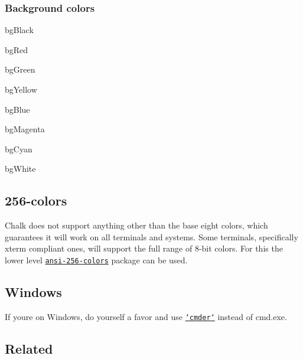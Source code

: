 \subsubsection*{Background colors}


\begin{DoxyItemize}
\item {\ttfamily bg\+Black}
\item {\ttfamily bg\+Red}
\item {\ttfamily bg\+Green}
\item {\ttfamily bg\+Yellow}
\item {\ttfamily bg\+Blue}
\item {\ttfamily bg\+Magenta}
\item {\ttfamily bg\+Cyan}
\item {\ttfamily bg\+White}
\end{DoxyItemize}

\subsection*{256-\/colors}

Chalk does not support anything other than the base eight colors, which guarantees it will work on all terminals and systems. Some terminals, specifically {\ttfamily xterm} compliant ones, will support the full range of 8-\/bit colors. For this the lower level \href{https://github.com/jbnicolai/ansi-256-colors}{\tt ansi-\/256-\/colors} package can be used.

\subsection*{Windows}

If you\textquotesingle{}re on Windows, do yourself a favor and use \href{http://bliker.github.io/cmder/}{\tt `cmder`} instead of {\ttfamily cmd.\+exe}.

\subsection*{Related}


